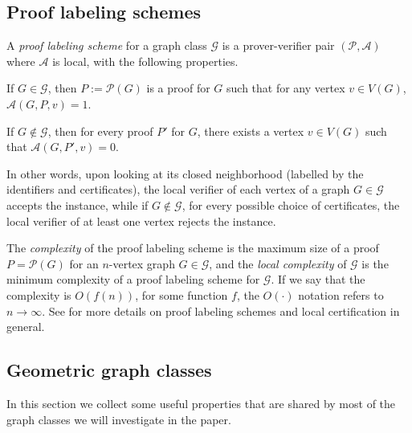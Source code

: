 \documentclass[a4paper,reqno, 12pt]{amsart}
\begin{document}
\subsection*{Proof labeling schemes}

A \emph{proof labeling scheme}
for a graph class $\mathcal{G}$ is a prover-verifier pair
$(\mathcal{P},\mathcal{A})$ where $\mathcal{A}$ is local, with the following properties.



\medskip

 If $G\in \mathcal{G}$, then
$P:=\mathcal{P}(G)$ is a proof for $G$ such that for any vertex $v\in
V(G)$, $\mathcal{A}(G,P,v)=1$.

\medskip

  If $G\not\in \mathcal{G}$, then for every proof
$P'$ for $G$, there exists a vertex $v\in
V(G)$ such
that  $\mathcal{A}(G,P',v)=0$.





\medskip

In other words, upon looking at its closed neighborhood (labelled by
the identifiers and certificates), the local verifier of each vertex
of a graph $G\in \mathcal{G}$ accepts the instance, while if $G\not\in
\mathcal{G}$, for every possible choice of certificates, the local verifier of at least one vertex rejects the instance.

\medskip

The \emph{complexity} of the proof labeling scheme is the maximum size of a
proof $P=\mathcal{P}(G)$ for an $n$-vertex graph $G\in\mathcal{G}$,
and the \emph{local complexity} of $\mathcal{G}$ is the minimum
complexity of a proof labeling scheme for $\mathcal{G}$. If we say that the complexity is $O(f(n))$, for some
function $f$, the $O(\cdot)$ notation refers to $n\to \infty$. See
\cite{Feu21,lcp} for more details on proof labeling schemes and local
certification in general.



\subsection{Geometric graph classes}\label{sec:gc}

In this section we collect some useful properties that are shared by
most of the graph classes we will investigate in the paper.

\medskip
\end{document}
